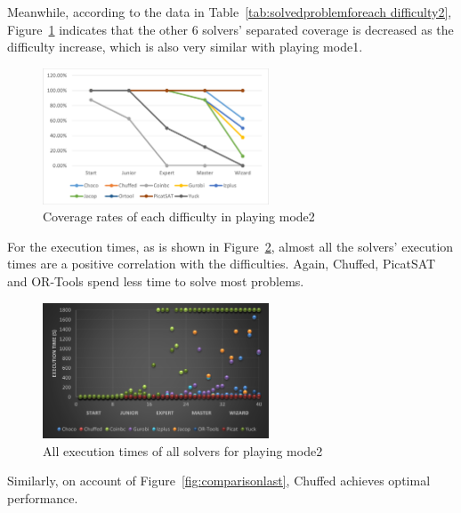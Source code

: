 Meanwhile, according to the data in Table~\ref{tab:solvedproblemforeach difficulty2}, Figure~\ref{fig:mode2eva4} indicates that the other 6 solvers' separated coverage is decreased as the difficulty increase, which is also very similar with playing mode1.
 \begin{figure}[H]
   \centering
    \includegraphics[width=0.6\textwidth]{figs/mode2seperatedcoverage.png}
    \caption{Coverage rates of each difficulty in playing mode2}
    \label{fig:mode2eva4}
\end{figure}
For the execution times, as is shown in Figure~\ref{fig:mode2time2}, almost all the solvers' execution times are a positive correlation with the difficulties. Again, Chuffed, PicatSAT and OR-Tools spend less time to solve most problems. 
\begin{figure}[H]
    \centering
    \includegraphics[width=0.6\textwidth]{figs/time2all.png}
    \caption{All execution times of all solvers for playing mode2}
    \label{fig:mode2time2}
\end{figure}
Similarly, on account of Figure~\ref{fig:comparisonlast}, Chuffed achieves optimal performance. 
